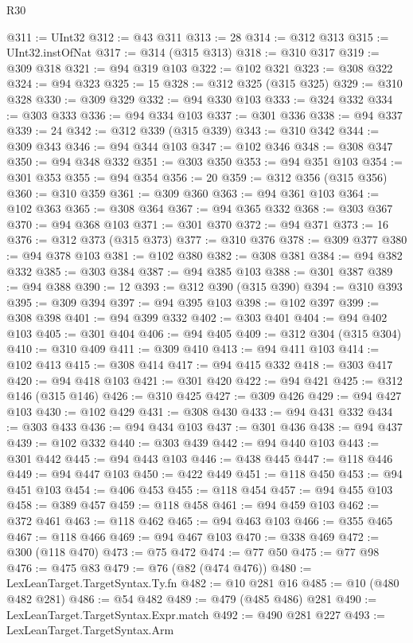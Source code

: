 \begin{lexlean}{R30}
\begin{coremodule}
@311 := UInt32
@312 := @43 @311
@313 := 28
@314 := @312 @313
@315 := UInt32.instOfNat
@317 := @314 (@315 @313)
@318 := @310 @317
@319 := @309 @318
@321 := @94 @319 @103
@322 := @102 @321
@323 := @308 @322
@324 := @94 @323
@325 := 15
@328 := @312 @325 (@315 @325)
@329 := @310 @328
@330 := @309 @329
@332 := @94 @330 @103
@333 := @324 @332
@334 := @303 @333
@336 := @94 @334 @103
@337 := @301 @336
@338 := @94 @337
@339 := 24
@342 := @312 @339 (@315 @339)
@343 := @310 @342
@344 := @309 @343
@346 := @94 @344 @103
@347 := @102 @346
@348 := @308 @347
@350 := @94 @348 @332
@351 := @303 @350
@353 := @94 @351 @103
@354 := @301 @353
@355 := @94 @354
@356 := 20
@359 := @312 @356 (@315 @356)
@360 := @310 @359
@361 := @309 @360
@363 := @94 @361 @103
@364 := @102 @363
@365 := @308 @364
@367 := @94 @365 @332
@368 := @303 @367
@370 := @94 @368 @103
@371 := @301 @370
@372 := @94 @371
@373 := 16
@376 := @312 @373 (@315 @373)
@377 := @310 @376
@378 := @309 @377
@380 := @94 @378 @103
@381 := @102 @380
@382 := @308 @381
@384 := @94 @382 @332
@385 := @303 @384
@387 := @94 @385 @103
@388 := @301 @387
@389 := @94 @388
@390 := 12
@393 := @312 @390 (@315 @390)
@394 := @310 @393
@395 := @309 @394
@397 := @94 @395 @103
@398 := @102 @397
@399 := @308 @398
@401 := @94 @399 @332
@402 := @303 @401
@404 := @94 @402 @103
@405 := @301 @404
@406 := @94 @405
@409 := @312 @304 (@315 @304)
@410 := @310 @409
@411 := @309 @410
@413 := @94 @411 @103
@414 := @102 @413
@415 := @308 @414
@417 := @94 @415 @332
@418 := @303 @417
@420 := @94 @418 @103
@421 := @301 @420
@422 := @94 @421
@425 := @312 @146 (@315 @146)
@426 := @310 @425
@427 := @309 @426
@429 := @94 @427 @103
@430 := @102 @429
@431 := @308 @430
@433 := @94 @431 @332
@434 := @303 @433
@436 := @94 @434 @103
@437 := @301 @436
@438 := @94 @437
@439 := @102 @332
@440 := @303 @439
@442 := @94 @440 @103
@443 := @301 @442
@445 := @94 @443 @103
@446 := @438 @445
@447 := @118 @446
@449 := @94 @447 @103
@450 := @422 @449
@451 := @118 @450
@453 := @94 @451 @103
@454 := @406 @453
@455 := @118 @454
@457 := @94 @455 @103
@458 := @389 @457
@459 := @118 @458
@461 := @94 @459 @103
@462 := @372 @461
@463 := @118 @462
@465 := @94 @463 @103
@466 := @355 @465
@467 := @118 @466
@469 := @94 @467 @103
@470 := @338 @469
@472 := @300 (@118 @470)
@473 := @75 @472
@474 := @77 @50
@475 := @77 @98
@476 := @475 @83
@479 := @76 (@82 (@474 @476))
@480 := LexLeanTarget.TargetSyntax.Ty.fn
@482 := @10 @281 @16
@485 := @10 (@480 @482 @281)
@486 := @54 @482
@489 := @479 (@485 @486) @281
@490 := LexLeanTarget.TargetSyntax.Expr.match
@492 := @490 @281 @227
@493 := LexLeanTarget.TargetSyntax.Arm

\end{coremodule}
\end{lexlean}
